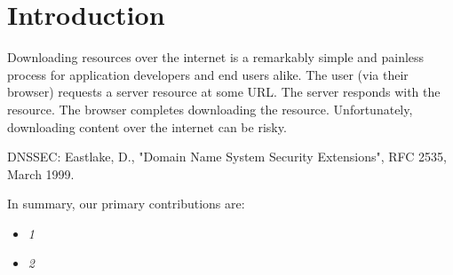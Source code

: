 \section{Introduction} \label{sec:introduction}

Downloading resources over the internet is a remarkably simple and painless
process for application developers and end users alike. The user (via their
browser) requests a server resource at some URL. The server responds with the
resource. The browser completes downloading the resource. Unfortunately,
downloading content over the internet can be risky.



DNSSEC: Eastlake, D., "Domain Name System Security Extensions", RFC 2535, March
1999.

In summary, our primary contributions are:

\begin{itemize}

  \item \emph{1} \SYSTEM{}

  \item \emph{2} \SYSTEM{}

\end{itemize}

